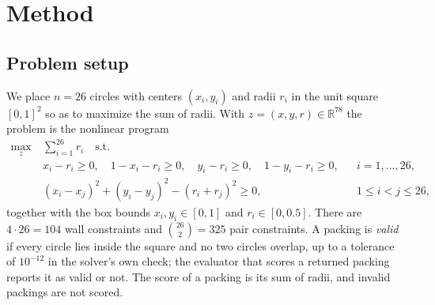 \documentclass{article} %
\begin{document}
\section{Method}
\subsection{Problem setup}
We place $n=26$ circles with centers $(x_i,y_i)$ and radii $r_i$ in the unit square $[0,1]^2$ so as to maximize the sum of radii. With $z=(x,y,r)\in\mathbb{R}^{78}$ the problem is the nonlinear program
\begin{align}
\max_{z}\ & \sum_{i=1}^{26} r_i \quad \text{s.t.}\label{eq:obj}\\
& x_i-r_i\ge 0,\quad 1-x_i-r_i\ge 0,\quad y_i-r_i\ge 0,\quad 1-y_i-r_i\ge 0, && i=1,\dots,26,\label{eq:wall}\\
& (x_i-x_j)^2+(y_i-y_j)^2-(r_i+r_j)^2\ge 0, && 1\le i<j\le 26,\label{eq:pair}
\end{align}
together with the box bounds $x_i,y_i\in[0,1]$ and $r_i\in[0,0.5]$. There are $4\cdot 26=104$ wall constraints and $\binom{26}{2}=325$ pair constraints.
A packing is \emph{valid} if every circle lies inside the square and no two circles overlap, up to a tolerance of $10^{-12}$ in the solver's own check; the evaluator that scores a returned packing reports it as valid or not. The score of a packing is its sum of radii, and invalid packings are not scored.
\end{document}
